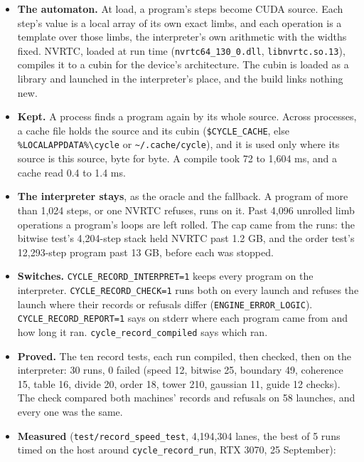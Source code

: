 \begin{enumerate}
\begin{itemize}
\item \textbf{The automaton.} At load, a program's steps become CUDA source. Each step's value is a local array of its own exact limbs, and each operation is a template over those limbs, the interpreter's own arithmetic with the widths fixed. NVRTC, loaded at run time (\texttt{nvrtc64\_\allowbreak{}130\_\allowbreak{}0.\allowbreak{}dll}, \texttt{libnvrtc.\allowbreak{}so.\allowbreak{}13}), compiles it to a cubin for the device's architecture. The cubin is loaded as a library and launched in the interpreter's place, and the build links nothing new.
\item \textbf{Kept.} A process finds a program again by its whole source. Across processes, a cache file holds the source and its cubin (\texttt{\$CYCLE\_\allowbreak{}CACHE}, else \texttt{\%LOCALAPPDATA\%\textbackslash{}cycle} or \texttt{\textasciitilde{}/\allowbreak{}.\allowbreak{}cache/\allowbreak{}cycle}), and it is used only where its source is this source, byte for byte. A compile took 72 to 1,604 ms, and a cache read 0.4 to 1.4 ms.
\item \textbf{The interpreter stays}, as the oracle and the fallback. A program of more than 1,024 steps, or one NVRTC refuses, runs on it. Past 4,096 unrolled limb operations a program's loops are left rolled. The cap came from the runs: the bitwise test's 4,204-step stack held NVRTC past 1.2 GB, and the order test's 12,293-step program past 13 GB, before each was stopped.
\item \textbf{Switches.} \texttt{CYCLE\_\allowbreak{}RECORD\_\allowbreak{}INTERPRET=1} keeps every program on the interpreter. \texttt{CYCLE\_\allowbreak{}RECORD\_\allowbreak{}CHECK=1} runs both on every launch and refuses the launch where their records or refusals differ (\texttt{ENGINE\_\allowbreak{}ERROR\_\allowbreak{}LOGIC}). \texttt{CYCLE\_\allowbreak{}RECORD\_\allowbreak{}REPORT=1} says on stderr where each program came from and how long it ran. \texttt{cycle\_\allowbreak{}record\_\allowbreak{}compiled} says which ran.
\item \textbf{Proved.} The ten record tests, each run compiled, then checked, then on the interpreter: 30 runs, 0 failed (speed 12, bitwise 25, boundary 49, coherence 15, table 16, divide 20, order 18, tower 210, gaussian 11, guide 12 checks). The check compared both machines' records and refusals on 58 launches, and every one was the same.
\item \textbf{Measured} (\texttt{test/\allowbreak{}record\_\allowbreak{}speed\_\allowbreak{}test}, 4,194,304 lanes, the best of 5 runs timed on the host around \texttt{cycle\_\allowbreak{}record\_\allowbreak{}run}, RTX 3070, 25 September):


\end{itemize}
\end{enumerate}
